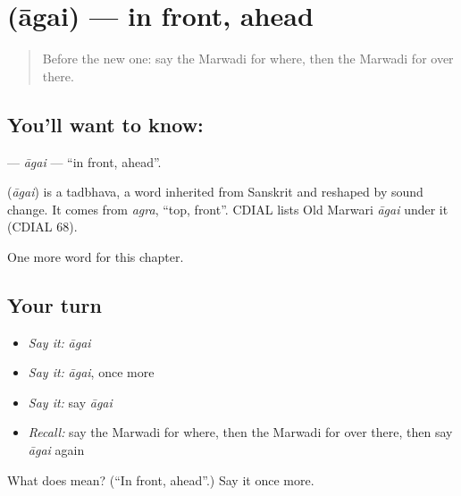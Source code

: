 \section[\texorpdfstring{\mw{आगै} (āgai)}{आगै (āgai)}]{ (āgai) — in front, ahead}

\label{lesson:MW-C96-agai}



\begin{quote}
Before the new one: say the Marwadi for where, then the Marwadi for over there.
\end{quote}

\subsection*{You'll want to know: }
\textbf{} — \emph{āgai} — \textquotedblleft{}in front, ahead\textquotedblright{}.

\begin{cousinweb}
\textbf{} (\emph{āgai}) is a tadbhava, a word inherited from Sanskrit and reshaped by sound change. It comes from \emph{agra}, \textquotedblleft{}top, front\textquotedblright{}. CDIAL lists Old Marwari \emph{āgai} under it (CDIAL 68).
\end{cousinweb}

\begin{grammarlens}[title={What you've built}]
One more word for this chapter.
\end{grammarlens}

\subsection*{Your turn}
\begin{itemize}
\raggedright
  \item \emph{Say it:} \emph{āgai}
  \item \emph{Say it:} \emph{āgai}, once more
  \item \emph{Say it:} say \emph{āgai}
  \item \emph{Recall:} say the Marwadi for where, then the Marwadi for over there, then say \emph{āgai} again
\end{itemize}

\begin{tcolorbox}[breakable,colback=teal!4,colframe=teal!35!black,title={Before you move on}]
What does  mean? (\textquotedblleft{}In front, ahead\textquotedblright{}.) Say it once more.
\end{tcolorbox}
